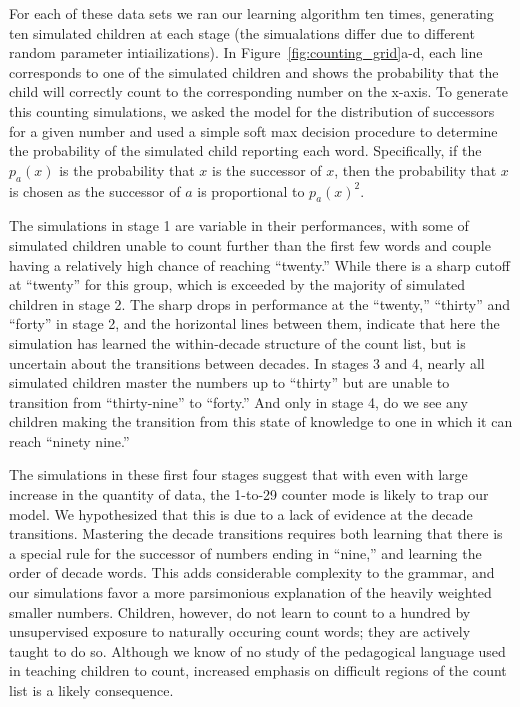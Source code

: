 \documentclass[10pt,letterpaper]{article}
\begin{document}
For each of these data sets we ran our learning algorithm ten times,
generating ten simulated children at each stage (the simualations
differ due to different random parameter intiailizations). In
Figure~\ref{fig:counting_grid}a-d, each line corresponds to one of the
simulated children and shows the probability that the child will
correctly count to the corresponding number on the x-axis. To generate
this counting simulations, we asked the model for the distribution of
successors for a given number and used a simple soft max decision
procedure to determine the probability of the simulated child
reporting each word. Specifically, if the $p_a(x)$ is the probability
that $x$ is the successor of $x$, then the probability that $x$ is
chosen as the successor of $a$ is proportional to $p_a(x)^2$.

The simulations in stage 1 are variable in their performances, with
some of simulated children unable to count further than the first few
words and couple having a relatively high chance of reaching
``twenty.'' While there is a sharp cutoff at ``twenty'' for this
group, which is exceeded by the majority of simulated children in
stage 2. The sharp drops in performance at the ``twenty,'' ``thirty''
and ``forty'' in stage 2, and the horizontal lines between them,
indicate that here the simulation has learned the within-decade
structure of the count list, but is uncertain about the transitions
between decades. In stages 3 and 4, nearly all simulated children
master the numbers up to ``thirty'' but are unable to transition from
``thirty-nine'' to ``forty.'' And only in stage 4, do we see any
children making the transition from this state of knowledge to one in
which it can reach ``ninety nine.'' 

The simulations in these first four stages suggest that with even with
large increase in the quantity of data, the 1-to-29 counter mode is
likely to trap our model. We hypothesized that this is due to a lack
of evidence at the decade transitions. Mastering the decade
transitions requires both learning that there is a special rule for
the successor of numbers ending in ``nine,'' and learning the order of
decade words. This adds considerable complexity to the grammar, and
our simulations favor a more parsimonious explanation of the heavily
weighted smaller numbers. Children, however, do not learn to count to
a hundred by unsupervised exposure to naturally occuring count words;
they are actively taught to do so. Although we know of no study of the
pedagogical language used in teaching children to count, increased
emphasis on difficult regions of the count list is a likely
consequence.
\end{document}
